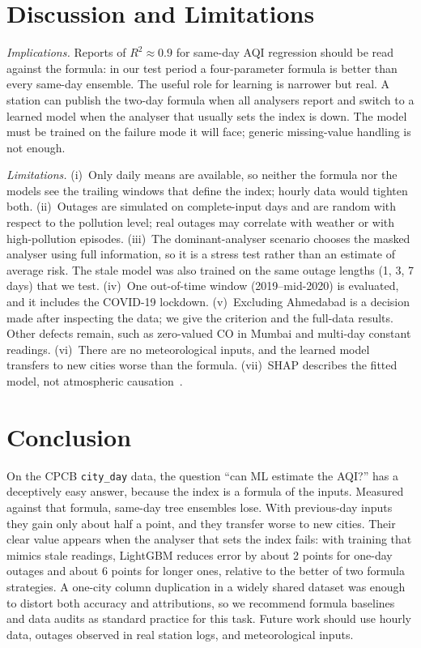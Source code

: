 \documentclass[conference]{IEEEtran}
\begin{document}
\section{Discussion and Limitations}
\textit{Implications.} Reports of $R^2\approx0.9$ for same-day AQI regression should be read
against the formula: in our test period a four-parameter formula is better than every same-day
ensemble. The useful role for learning is narrower but real. A station can publish the
two-day formula when all analysers report and switch to a learned model when the
analyser that usually sets the index is down. The model must be trained on the failure mode it
will face; generic missing-value handling is not enough.

\textit{Limitations.} (i)~Only daily means are available, so neither the formula nor the models
see the trailing windows that define the index; hourly data would tighten both.
(ii)~Outages are simulated on complete-input days and are random with respect to the
pollution level; real outages may correlate with weather or with high-pollution episodes.
(iii)~The dominant-analyser scenario chooses the masked analyser using full information, so
it is a stress test rather than an estimate of average risk. The stale model was also trained
on the same outage lengths (1, 3, 7 days) that we test. (iv)~One out-of-time window
(2019--mid-2020) is evaluated, and it includes the COVID-19 lockdown. (v)~Excluding Ahmedabad
is a decision made after inspecting the data; we give the criterion and the full-data
results. Other defects remain, such as zero-valued CO in Mumbai and multi-day constant
readings. (vi)~There are no meteorological inputs, and the learned model transfers to new
cities worse than the formula. (vii)~SHAP describes the fitted model, not atmospheric
causation~\cite{lundberg2020treeshap}.

\section{Conclusion}
On the CPCB \texttt{city\_day} data, the question ``can ML estimate the AQI?'' has a
deceptively easy answer, because the index is a formula of the inputs. Measured against that
formula, same-day tree ensembles lose. With previous-day inputs they gain only about half
a point, and they transfer worse to new cities. Their clear value appears when the analyser
that sets the index fails: with training that mimics stale readings, LightGBM reduces error
by about 2 points for one-day outages and about 6 points for longer ones, relative to the
better of two formula strategies. A one-city column duplication in a widely shared dataset was
enough to distort both accuracy and attributions, so we recommend formula baselines and
data audits as standard practice for this task. Future work should use hourly data, outages
observed in real station logs, and meteorological inputs.
\end{document}
